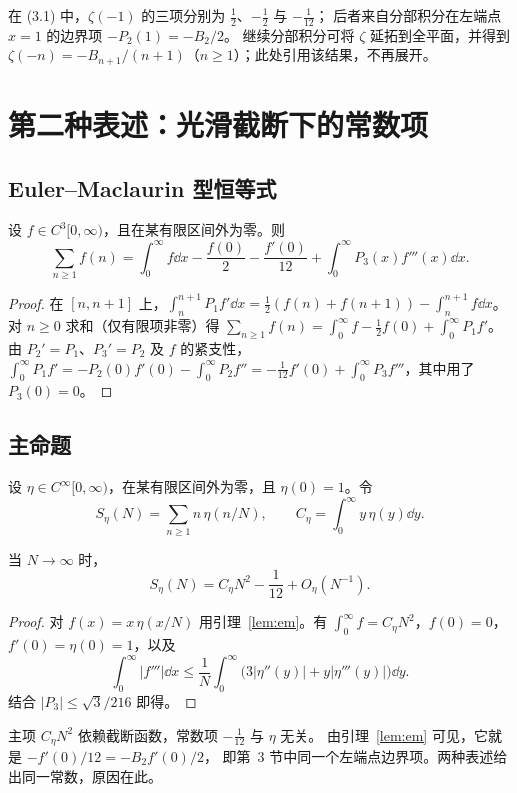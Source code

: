 \documentclass[11pt]{article}
\begin{document}
在 (3.1) 中，$\zeta(-1)$ 的三项分别为 $\tfrac12$、$-\tfrac12$ 与 $-\tfrac1{12}$；
后者来自分部积分在左端点 $x=1$ 的边界项 $-P_2(1)=-B_2/2$。
继续分部积分可将 $\zeta$ 延拓到全平面，并得到
$\zeta(-n)=-B_{n+1}/(n+1)$（$n\ge1$）；此处引用该结果，不再展开。

\section{第二种表述：光滑截断下的常数项}
\subsection{Euler--Maclaurin 型恒等式}
\begin{lemma}\label{lem:em}
设 $f\in C^3[0,\infty)$，且在某有限区间外为零。则
\[
 \sum_{n\ge1}f(n)=\int_0^\infty f\dd x-\frac{f(0)}2-\frac{f'(0)}{12}
 +\int_0^\infty P_3(x)f'''(x)\dd x .                                \tag{4.1}
\]
\end{lemma}
\begin{proof}
在 $[n,n+1]$ 上，$\int_n^{n+1}P_1f'\dd x=\tfrac12(f(n)+f(n+1))-\int_n^{n+1}f\dd x$。
对 $n\ge0$ 求和（仅有限项非零）得
$\sum_{n\ge1}f(n)=\int_0^\infty f-\tfrac12f(0)+\int_0^\infty P_1f'$。
由 $P_2'=P_1$、$P_3'=P_2$ 及 $f$ 的紧支性，
$\int_0^\infty P_1f'=-P_2(0)f'(0)-\int_0^\infty P_2f''
=-\tfrac1{12}f'(0)+\int_0^\infty P_3f'''$，其中用了 $P_3(0)=0$。
\end{proof}

\subsection{主命题}
设 $\eta\in C^\infty[0,\infty)$，在某有限区间外为零，且 $\eta(0)=1$。令
\[
 S_\eta(N)=\sum_{n\ge1}n\,\eta(n/N),\qquad C_\eta=\int_0^\infty y\,\eta(y)\dd y .
\]
\begin{proposition}\label{prop:smooth}
当 $N\to\infty$ 时，
\[
 S_\eta(N)=C_\eta N^2-\frac1{12}+O_\eta(N^{-1}).
\]
\end{proposition}
\begin{proof}
对 $f(x)=x\,\eta(x/N)$ 用引理~\ref{lem:em}。有
$\int_0^\infty f=C_\eta N^2$，$f(0)=0$，$f'(0)=\eta(0)=1$，以及
\[
 \int_0^\infty|f'''|\dd x
 \le\frac1N\int_0^\infty\bigl(3|\eta''(y)|+y|\eta'''(y)|\bigr)\dd y .
\]
结合 $|P_3|\le\sqrt3/216$ 即得。
\end{proof}

主项 $C_\eta N^2$ 依赖截断函数，常数项 $-\tfrac1{12}$ 与 $\eta$ 无关。
由引理~\ref{lem:em} 可见，它就是 $-f'(0)/12=-B_2f'(0)/2$，
即第~3 节中同一个左端点边界项。两种表述给出同一常数，原因在此。
\end{document}
